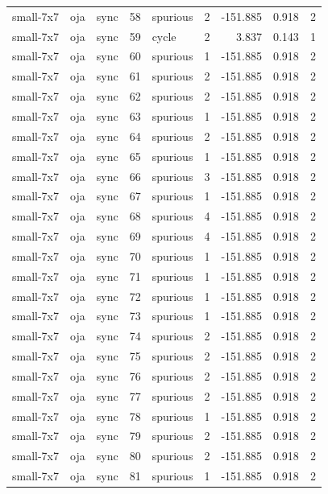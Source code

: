 \begin{tabular}{lllrlrrrr}
small-7x7 & oja & sync & 58 & spurious & 2 & -151.885 & 0.918 & 2 \\
small-7x7 & oja & sync & 59 & cycle & 2 & 3.837 & 0.143 & 1 \\
small-7x7 & oja & sync & 60 & spurious & 1 & -151.885 & 0.918 & 2 \\
small-7x7 & oja & sync & 61 & spurious & 2 & -151.885 & 0.918 & 2 \\
small-7x7 & oja & sync & 62 & spurious & 2 & -151.885 & 0.918 & 2 \\
small-7x7 & oja & sync & 63 & spurious & 1 & -151.885 & 0.918 & 2 \\
small-7x7 & oja & sync & 64 & spurious & 2 & -151.885 & 0.918 & 2 \\
small-7x7 & oja & sync & 65 & spurious & 1 & -151.885 & 0.918 & 2 \\
small-7x7 & oja & sync & 66 & spurious & 3 & -151.885 & 0.918 & 2 \\
small-7x7 & oja & sync & 67 & spurious & 1 & -151.885 & 0.918 & 2 \\
small-7x7 & oja & sync & 68 & spurious & 4 & -151.885 & 0.918 & 2 \\
small-7x7 & oja & sync & 69 & spurious & 4 & -151.885 & 0.918 & 2 \\
small-7x7 & oja & sync & 70 & spurious & 1 & -151.885 & 0.918 & 2 \\
small-7x7 & oja & sync & 71 & spurious & 1 & -151.885 & 0.918 & 2 \\
small-7x7 & oja & sync & 72 & spurious & 1 & -151.885 & 0.918 & 2 \\
small-7x7 & oja & sync & 73 & spurious & 1 & -151.885 & 0.918 & 2 \\
small-7x7 & oja & sync & 74 & spurious & 2 & -151.885 & 0.918 & 2 \\
small-7x7 & oja & sync & 75 & spurious & 2 & -151.885 & 0.918 & 2 \\
small-7x7 & oja & sync & 76 & spurious & 2 & -151.885 & 0.918 & 2 \\
small-7x7 & oja & sync & 77 & spurious & 2 & -151.885 & 0.918 & 2 \\
small-7x7 & oja & sync & 78 & spurious & 1 & -151.885 & 0.918 & 2 \\
small-7x7 & oja & sync & 79 & spurious & 2 & -151.885 & 0.918 & 2 \\
small-7x7 & oja & sync & 80 & spurious & 2 & -151.885 & 0.918 & 2 \\
small-7x7 & oja & sync & 81 & spurious & 1 & -151.885 & 0.918 & 2 \\

\end{tabular}
